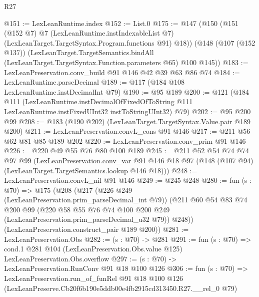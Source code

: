 \begin{lexlean}{R27}
\begin{coremodule}
@151 := LexLeanRuntime.index
@152 := List.{0}
@175 := @147
    (@150
      (@151
        (@152 @7)
        @7
        (LexLeanRuntime.instIndexableList @7)
        (LexLeanTarget.TargetSyntax.Program.functions @91)
        @18))
    (@148
      (@107 (@152 @137))
      (LexLeanTarget.TargetSemantics.bindAll
        (LexLeanTarget.TargetSyntax.Function.parameters @65)
        @100
        @145))
@183 := LexLeanPreservation.conv_build @91 @146 @42 @39 @63 @86 @74
@184 := LexLeanRuntime.parseDecimal
@189 := @117 (@184 @108 LexLeanRuntime.instDecimalInt @79)
@190 := @95 @189
@200 := @121
    (@184
      @111
      (LexLeanRuntime.instDecimalOfFixedOfToString
        @111
        LexLeanRuntime.instFixedUInt32
        instToStringUInt32)
      @79)
@202 := @95 @200 @99
@208 := @183 (@190 @202) (LexLeanTarget.TargetSyntax.Value.pair @189 @200)
@211 := LexLeanPreservation.convL_cons @91 @146
@217 := @211 @56 @62 @81 @85 @189 @202
@220 := LexLeanPreservation.conv_prim @91 @146
@226 := @220 @49 @55 @76 @80 @100 @189
@245 := @211
    @52
    @54
    @74
    @74
    @97
    @99
    (LexLeanPreservation.conv_var
      @91
      @146
      @18
      @97
      (@148 (@107 @94) (LexLeanTarget.TargetSemantics.lookup @146 @18)))
@248 := LexLeanPreservation.convL_nil @91 @146
@249 := @245 @248
@280 := fun (s : @70) =>
  @175
    (@208
      (@217
        (@226 @249 (LexLeanPreservation.prim_parseDecimal_int @79))
        (@211
          @60
          @54
          @83
          @74
          @200
          @99
          (@220 @58 @55 @76 @74 @100 @200 @249 (LexLeanPreservation.prim_parseDecimal_u32 @79))
          @248))
      (LexLeanPreservation.construct_pair @189 @200))
@281 := LexLeanPreservation.Obs
@282 := (s : @70) -> @281
@291 := fun (s : @70) =>
  cond.{1} @281 @104 (LexLeanPreservation.Obs.value @125) LexLeanPreservation.Obs.overflow
@297 := (s : @70) -> LexLeanPreservation.RunConv @91 @18 @100 @126
@306 := fun (s : @70) =>
  LexLeanPreservation.run_of_funRel
    @91
    @18
    @100
    @126
    (LexLeanPreserve.Cb20f6b190e5ddb00e4fb2915cd313450.R27.__rel_0 @79)
\end{coremodule}
\end{lexlean}
